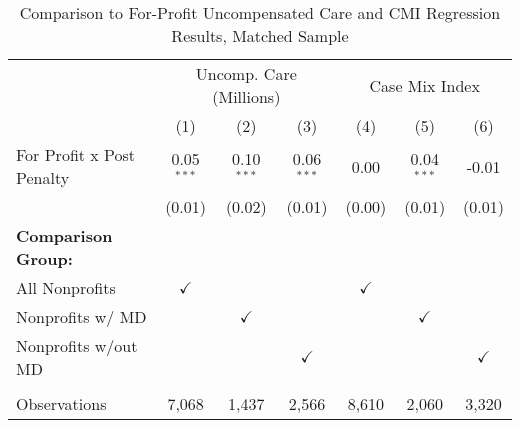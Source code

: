 \begin{table}[htbp]
   \caption{\label{tab:forprofit_uncomp_CMI_matchsample} Comparison to For-Profit Uncompensated Care and CMI Regression Results, Matched Sample}
   \bigskip
   \centering
   \begin{tabular}{lcccccc}
      \toprule
       & \multicolumn{3}{c}{Uncomp. Care (Millions)} & \multicolumn{3}{c}{Case Mix Index}\\
                                  & (1)           & (2)           & (3)           & (4)           & (5)           & (6)\\  
      \midrule 
      For Profit x Post Penalty   & 0.05$^{***}$  & 0.10$^{***}$  & 0.06$^{***}$  & 0.00          & 0.04$^{***}$  & -0.01\\   
                                  & (0.01)        & (0.02)        & (0.01)        & (0.00)        & (0.01)        & (0.01)\\   
      \textbf{Comparison Group:}  &               &               &               &               &               & \\  
      All Nonprofits              & $\checkmark$  &               &               & $\checkmark$  &               & \\  
      Nonprofits w/ MD            &               & $\checkmark$  &               &               & $\checkmark$  & \\  
      Nonprofits w/out MD         &               &               & $\checkmark$  &               &               & $\checkmark$\\   
       \\
      Observations                & 7,068         & 1,437         & 2,566         & 8,610         & 2,060         & 3,320\\  
      \bottomrule
   \end{tabular}
\end{table}
